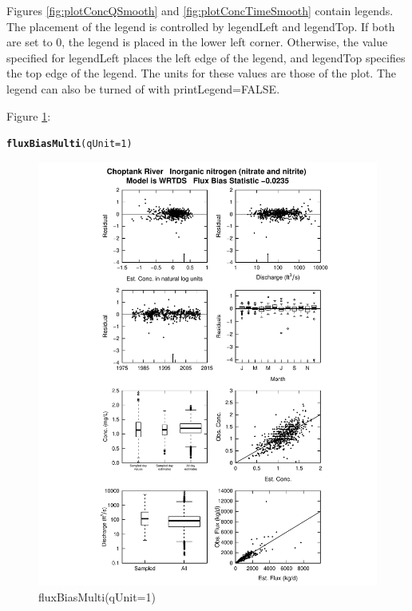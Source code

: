 \documentclass[a4paper,11pt]{article}\usepackage[]{graphicx}\usepackage[]{color}
\makeatletter
\def\maxwidth{ %
  \ifdim\Gin@nat@width>\linewidth
    \linewidth
  \else
    \Gin@nat@width
  \fi
}
\newcommand{\hlnum}[1]{\textcolor[rgb]{0.686,0.059,0.569}{#1}}%
\newcommand{\hlstd}[1]{\textcolor[rgb]{0.345,0.345,0.345}{#1}}%
\newcommand{\hlkwc}[1]{\textcolor[rgb]{0.333,0.667,0.333}{#1}}%
\newcommand{\hlkwd}[1]{\textcolor[rgb]{0.737,0.353,0.396}{\textbf{#1}}}%
\newenvironment{kframe}{%
 \def\at@end@of@kframe{}%
 \ifinner\ifhmode%
  \def\at@end@of@kframe{\end{minipage}}%
  \begin{minipage}{\columnwidth}%
 \fi\fi%
 \def\FrameCommand##1{\hskip\@totalleftmargin \hskip-\fboxsep
 \colorbox{shadecolor}{##1}\hskip-\fboxsep
     \hskip-\linewidth \hskip-\@totalleftmargin \hskip\columnwidth}%
 \MakeFramed {\advance\hsize-\width
   \@totalleftmargin\z@ \linewidth\hsize
   \@setminipage}}%
 {\par\unskip\endMakeFramed%
 \at@end@of@kframe}
\newenvironment{knitrout}{}{} %
\makeatother
\begin{document}
Figures \ref{fig:plotConcQSmooth} and \ref{fig:plotConcTimeSmooth} contain legends. The placement of the legend is controlled by legendLeft and legendTop. If both are set to 0, the legend is placed in the lower left corner. Otherwise, the value specified for legendLeft places the left edge of the legend, and legendTop specifies the top edge of the legend. The units for these values are those of the plot. The legend can also be turned of with printLegend=FALSE.


Figure \ref{fig:fluxBiasMulti}:
\begin{knitrout}
\color{fgcolor}\begin{kframe}
\begin{alltt}
\hlkwd{fluxBiasMulti}\hlstd{(}\hlkwc{qUnit}\hlstd{=}\hlnum{1}\hlstd{)}
\end{alltt}
\end{kframe}\begin{figure}[]

\includegraphics[width=\maxwidth]{figure/fluxBiasMulti} \caption[fluxBiasMulti(qUnit=1)]{fluxBiasMulti(qUnit=1)\label{fig:fluxBiasMulti}}
\end{figure}


\end{knitrout}
\end{document}
